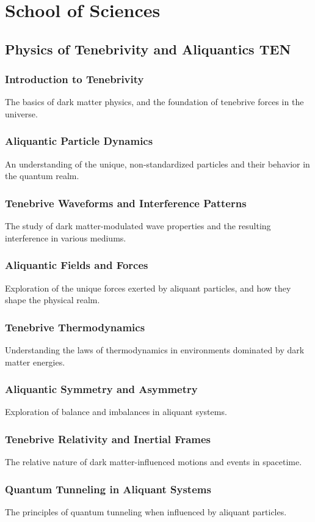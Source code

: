 \section{School of Sciences}


\subsection{Physics of Tenebrivity and Aliquantics \hfill TEN}
\subsubsection{Introduction to Tenebrivity}
The basics of dark matter physics, and the foundation of tenebrive forces in the universe.
\subsubsection{Aliquantic Particle Dynamics}
An understanding of the unique, non-standardized particles and their behavior in the quantum realm.
\subsubsection{Tenebrive Waveforms and Interference Patterns}
The study of dark matter-modulated wave properties and the resulting interference in various mediums.
\subsubsection{Aliquantic Fields and Forces}
Exploration of the unique forces exerted by aliquant particles, and how they shape the physical realm.
\subsubsection{Tenebrive Thermodynamics}
Understanding the laws of thermodynamics in environments dominated by dark matter energies.
\subsubsection{Aliquantic Symmetry and Asymmetry}
Exploration of balance and imbalances in aliquant systems.
\subsubsection{Tenebrive Relativity and Inertial Frames}
The relative nature of dark matter-influenced motions and events in spacetime.
\subsubsection{Quantum Tunneling in Aliquant Systems}
The principles of quantum tunneling when influenced by aliquant particles.
